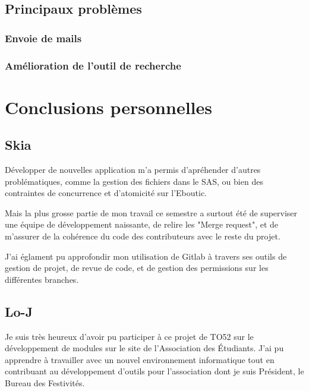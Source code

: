 \documentclass[a4paper]{report}
\begin{document}
\section{Principaux problèmes}
\label{sec:principaux_problemes}

\subsection{Envoie de mails}
\label{sub:envoie_de_mails}

\subsection{Amélioration de l'outil de recherche}
\label{sub:amelioration_de_l_outil_de_recherche}


\chapter{Conclusions personnelles}
\section{Skia}
\label{sec:skia}
\par Développer de nouvelles application m'a permis d'apréhender d'autres problématiques, comme la gestion des fichiers
dans le SAS, ou bien des contraintes de concurrence et d'atomicité sur l'Eboutic.

\par Mais la plus grosse partie de mon travail ce semestre a surtout été de superviser une équipe de développement
naissante, de relire les "Merge request", et de m'assurer de la cohérence du code des contributeurs avec le reste du
projet.

\par J'ai églament pu approfondir mon utilisation de Gitlab à travers ses outils de gestion de projet, de revue de code,
et de gestion des permissions sur les différentes branches.

\section{Lo-J}
\label{sec:lo_j}
\par Je suis très heureux d’avoir pu participer à ce projet de TO52 sur le développement de modules sur le site de l’Association des Étudiants. J’ai pu apprendre à travailler avec un nouvel environnement informatique tout en contribuant au développement d’outils pour l’association dont je suis Président, le Bureau des Festivités.
\end{document}
